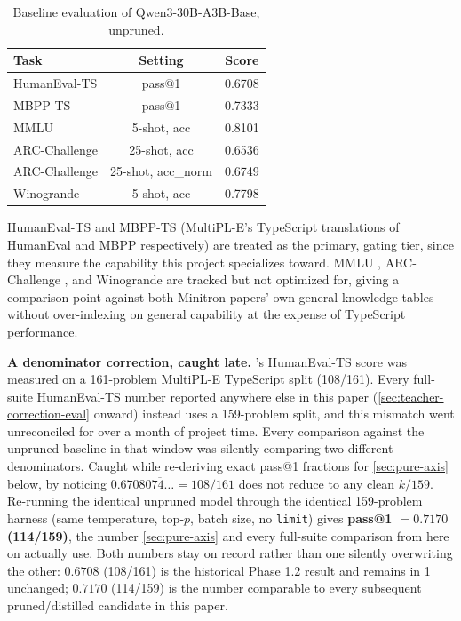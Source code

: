\documentclass{article}
\theoremstyle{plain}
\theoremstyle{definition}
\theoremstyle{remark}
\begin{document}
\begin{table}[t]
\centering
\small
\begin{tabular}{lcc}
\toprule
Task & Setting & Score \\
\midrule
HumanEval-TS & pass@1 & 0.6708 \\
MBPP-TS & pass@1 & 0.7333 \\
MMLU & 5-shot, acc & 0.8101 \\
ARC-Challenge & 25-shot, acc & 0.6536 \\
ARC-Challenge & 25-shot, acc\_norm & 0.6749 \\
Winogrande & 5-shot, acc & 0.7798 \\
\bottomrule
\end{tabular}
\caption{Baseline evaluation of Qwen3-30B-A3B-Base, unpruned.}
\label{tab:baseline}
\end{table}

HumanEval-TS and MBPP-TS (MultiPL-E's \cite{multiple2023} TypeScript
translations of HumanEval \cite{humaneval2021} and MBPP \cite{mbpp2021}
respectively) are treated as the primary, gating tier, since they
measure the capability this project specializes toward. MMLU
\cite{mmlu2021}, ARC-Challenge \cite{arc2018}, and Winogrande
\cite{winogrande2021} are tracked but not optimized for, giving a
comparison point against both Minitron papers' own general-knowledge
tables without over-indexing on general
capability at the expense of TypeScript performance.

\textbf{A denominator correction, caught late.} 's
HumanEval-TS score was measured on a 161-problem MultiPL-E TypeScript split
(108/161). Every full-suite HumanEval-TS number reported anywhere else in
this paper (\cref{sec:teacher-correction-eval} onward) instead uses a
159-problem split, and this mismatch went unreconciled for over a month of
project time. Every comparison against the unpruned baseline in that
window was silently comparing two different denominators. Caught while
re-deriving exact pass@1 fractions for \cref{sec:pure-axis} below, by
noticing $0.6708\overline{074\ldots} = 108/161$ does not reduce to any clean
$k/159$. Re-running the identical unpruned model through the identical
159-problem harness (same temperature, top-$p$, batch size, no \texttt{limit})
gives \textbf{pass@1 $=0.7170$ (114/159)}, the number \cref{sec:pure-axis}
and every full-suite comparison from here on actually use. Both numbers
stay on record rather than one silently overwriting the other: $0.6708$
(108/161) is the historical Phase 1.2 result and remains in
\cref{tab:baseline} unchanged; $0.7170$ (114/159) is the number comparable
to every subsequent pruned/distilled candidate in this paper.
\end{document}
